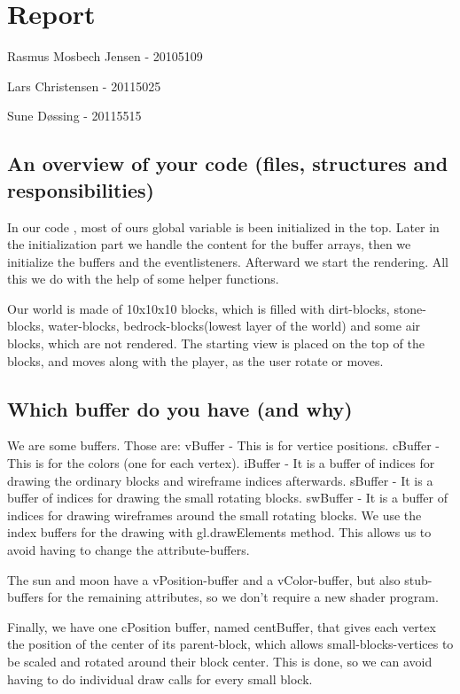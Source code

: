 \section{Report}

Rasmus Mosbech Jensen - 20105109

Lars Christensen - 20115025

Sune D\o ssing - 20115515 

\subsection{An overview of your code (files, structures and responsibilities)}

In our code , most of ours global variable is been initialized in the 
top. Later in the initialization part we handle the content for the buffer arrays, then we initialize the buffers and the eventlisteners.
Afterward we start the rendering. All this we do with the help of some helper functions.

Our world is made of 10x10x10 blocks, which is filled with dirt-blocks, stone-blocks, water-blocks, bedrock-blocks(lowest layer of the world) and some air blocks, which are not rendered.
The starting view is placed on the top of the blocks, and moves along with the player, as the user rotate or moves.

\subsection{Which buffer do you have (and why)}

We are some buffers. Those are:
vBuffer - This is for vertice positions. 
cBuffer - This is for the colors (one for each vertex).
iBuffer - It is a buffer of indices for drawing the ordinary blocks and wireframe indices afterwards.
sBuffer - It is a buffer of indices for drawing the small rotating blocks.
swBuffer - It is a buffer of indices for drawing wireframes around the small rotating blocks.
We use the index buffers for the drawing with gl.drawElements method. This allows us to avoid having to change the attribute-buffers.

The sun and moon have a vPosition-buffer and a vColor-buffer, but also stub-buffers for the remaining attributes, so we don't require a new shader program.

Finally, we have one cPosition buffer, named centBuffer, 
that gives each vertex the position of the center of its parent-block, 
which allows small-blocks-vertices to be scaled and rotated around their block center.
This is done, so we can avoid having to do individual draw calls for every small block.

